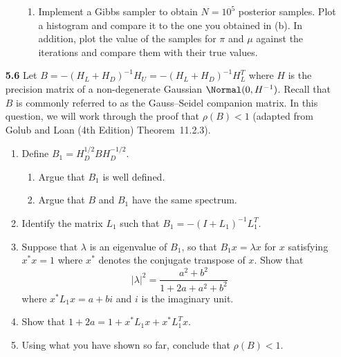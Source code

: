 \begin{enumerate}
\begin{enumerate}
\begin{enumerate}[label=\alph*)]
        \item Implement a Gibbs sampler to obtain $N = 10^5$ posterior samples. Plot a
          histogram and compare it to the one you obtained in (b). In addition, plot the value
          of the samples for $\pi$ and $\mu$ against the iterations and compare them with
          their true values.
      \end{enumerate}
  \end{enumerate}

\item[\textbf{5.6}] Let $B = -(H_L + H_D)^{-1}H_U = -(H_L + H_D)^{-1}H_L^T$ where $H$ is
  the precision matrix of a non-degenerate Gaussian $\Normal(0, H^{-1})$. Recall that $B$ is
  commonly referred to as the Gauss--Seidel companion matrix. In this question, we will work
  through the proof that $\rho(B) < 1$ (adapted from Golub and Loan (4th Edition)
  Theorem~11.2.3).

  \begin{enumerate}
    \item Define $B_1 = H_D^{1/2} B H_D^{-1/2}$.
      \begin{enumerate}[label=(\alph*)]
        \item Argue that $B_1$ is well defined.
        \item Argue that $B$ and $B_1$ have the same spectrum.
      \end{enumerate}

    \item Identify the matrix $L_1$ such that $B_1 = -(I + L_1)^{-1}L_1^T$.

    \item Suppose that $\lambda$ is an eigenvalue of $B_1$, so that $B_1 x = \lambda x$ for
      $x$ satisfying $x^* x = 1$ where $x^*$ denotes the conjugate transpose of $x$. Show
      that
      \[
        |\lambda|^2 = \frac{a^2 + b^2}{1 + 2a + a^2 + b^2}
      \]
      where $x^* L_1 x = a + bi$ and $i$ is the imaginary unit.

    \item Show that $1 + 2a = 1 + x^* L_1 x + x^* L_1^T x$.

    \item Using what you have shown so far, conclude that $\rho(B) < 1$.
  \end{enumerate}

\end{enumerate}

